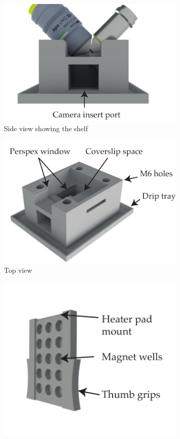 \begin{figure}
    \centering
    \begin{subfigure}[b]{\linewidth}
         \centering
        \includegraphics{./chamber_side.pdf}
         \caption{Side view showing the shelf}\label{fig:chamber_side}
    \end{subfigure}
    \begin{subfigure}[b]{0.5\linewidth}
             \centering
        \includegraphics{./chamber_top.pdf}
         \caption{Top view}\label{fig:chamber_top}
    \end{subfigure}
    \begin{subfigure}[b]{0.3\linewidth}
             \centering
        \includegraphics{./chamber_slide.pdf}

\end{subfigure}
\end{figure}
